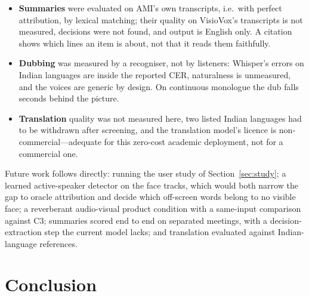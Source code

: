 \documentclass[conference]{IEEEtran}
\begin{document}
\begin{itemize}
\item \textbf{Summaries} were evaluated on AMI's own transcripts, i.e.\ with perfect attribution, by lexical matching; their quality on VisioVox's transcripts is not measured, decisions were not found, and output is English only. A citation shows which lines an item is about, not that it reads them faithfully.
\item \textbf{Dubbing} was measured by a recogniser, not by listeners: Whisper's errors on Indian languages are inside the reported CER, naturalness is unmeasured, and the voices are generic by design. On continuous monologue the dub falls seconds behind the picture.
\item \textbf{Translation} quality was not measured here, two listed Indian languages had to be withdrawn after screening, and the translation model's licence is non-commercial---adequate for this zero-cost academic deployment, not for a commercial one.
\end{itemize}
Future work follows directly: running the user study of Section~\ref{sec:study}; a learned active-speaker detector on the face tracks, which would both narrow the gap to oracle attribution and decide which off-screen words belong to no visible face; a reverberant audio-visual product condition with a same-input comparison against C3; summaries scored end to end on separated meetings, with a decision-extraction step the current model lacks; and translation evaluated against Indian-language references.

\section{Conclusion}
\end{document}
